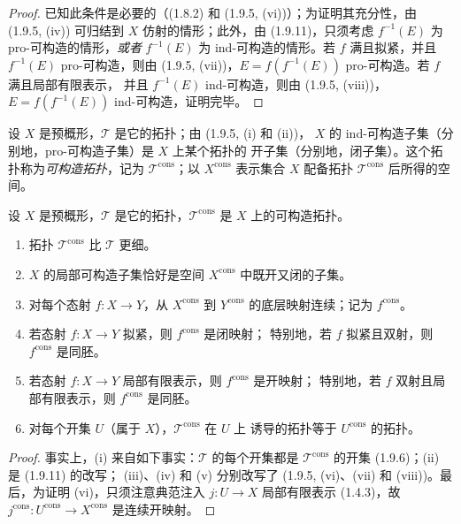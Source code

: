 \begin{proof}
已知此条件是必要的（(1.8.2) 和 (1.9.5, (vi))）；为证明其充分性，由
(1.9.5, (iv)) 可归结到 $X$ 仿射的情形；此外，由 (1.9.11)，只须考虑
$f^{-1}(E)$ 为 pro-可构造的情形，\emph{或者} $f^{-1}(E)$ 为
ind-可构造的情形。若 $f$ 满且拟紧，并且 $f^{-1}(E)$ pro-可构造，则由
(1.9.5, (vii))，$E=f(f^{-1}(E))$ pro-可构造。若 $f$ 满且局部有限表示，
并且 $f^{-1}(E)$ ind-可构造，则由 (1.9.5, (viii))，
$E=f(f^{-1}(E))$ ind-可构造，证明完毕。
\end{proof}

\begin{env}[1.9.13]
\label{IV.1.9.13-fr}
设 $X$ 是预概形，$\mathscr T$ 是它的拓扑；由 (1.9.5, (i) 和 (ii))，
$X$ 的 ind-可构造子集（分别地，pro-可构造子集）是 $X$ 上某个拓扑的
开子集（分别地，闭子集）。这个拓扑称为\emph{可构造拓扑}，记为
$\mathscr T^{\mathrm{cons}}$；以 $X^{\mathrm{cons}}$ 表示集合 $X$ 配备拓扑
$\mathscr T^{\mathrm{cons}}$ 后所得的空间。
\end{env}

\begin{proposition}[1.9.14]
\label{IV.1.9.14-fr}
设 $X$ 是预概形，$\mathscr T$ 是它的拓扑，$\mathscr T^{\mathrm{cons}}$
是 $X$ 上的可构造拓扑。
\begin{enumerate}
  \item[(i)] 拓扑 $\mathscr T^{\mathrm{cons}}$ 比 $\mathscr T$ 更细。
  \item[(ii)] $X$ 的局部可构造子集恰好是空间 $X^{\mathrm{cons}}$ 中既开又闭的子集。
  \item[(iii)] 对每个态射 $f:X\to Y$，从 $X^{\mathrm{cons}}$ 到
  $Y^{\mathrm{cons}}$ 的底层映射连续；记为 $f^{\mathrm{cons}}$。
  \item[(iv)] 若态射 $f:X\to Y$ 拟紧，则 $f^{\mathrm{cons}}$ 是闭映射；
  特别地，若 $f$ 拟紧且双射，则 $f^{\mathrm{cons}}$ 是同胚。
  \item[(v)] 若态射 $f:X\to Y$ 局部有限表示，则 $f^{\mathrm{cons}}$ 是开映射；
  特别地，若 $f$ 双射且局部有限表示，则 $f^{\mathrm{cons}}$ 是同胚。
  \item[(vi)] 对每个开集 $U$（属于 $X$），$\mathscr T^{\mathrm{cons}}$ 在 $U$ 上
  诱导的拓扑等于 $U^{\mathrm{cons}}$ 的拓扑。
\end{enumerate}
\end{proposition}

\begin{proof}
事实上，(i) 来自如下事实：$\mathscr T$ 的每个开集都是
$\mathscr T^{\mathrm{cons}}$ 的开集 (1.9.6)；(ii) 是 (1.9.11) 的改写；
(iii)、(iv) 和 (v) 分别改写了 (1.9.5, (vi)、(vii) 和 (viii))。最后，为证明
(vi)，只须注意典范注入 $j:U\to X$ 局部有限表示 (1.4.3)，故
$j^{\mathrm{cons}}:U^{\mathrm{cons}}\to X^{\mathrm{cons}}$ 是连续开映射。
\end{proof}

